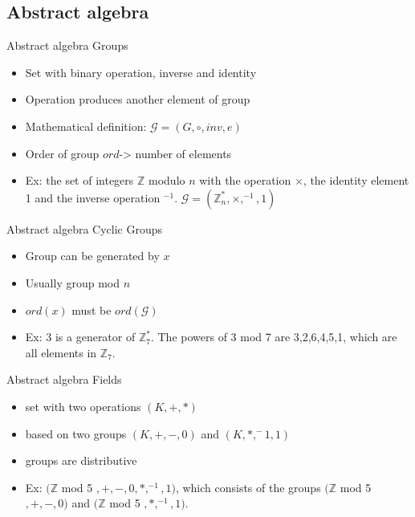 \documentclass{beamer}
\begin{document}
\subsection{Abstract algebra}
\begin{frame}{Abstract algebra}
	Groups
	\begin{itemize}
		\item Set with binary operation, inverse and identity
		\item Operation produces another element of group
		\item Mathematical definition: $\mathcal{G} = (G, \circ, inv, e)$
		\item Order of group $ord$-> number of elements
		\item Ex: the set of integers $\mathbb{Z}$ modulo $n$ with the operation $\times$, the identity element 1 and the inverse operation $^{-1}$. $\mathcal{G} = (\mathbb{Z}_{n}^*, \times, ^{-1}, 1)$
	\end{itemize}
\end{frame}
\begin{frame}{Abstract algebra}
	Cyclic Groups
	\begin{itemize}
		\item Group can be generated by $x$
		\item Usually group mod $n$
		\item $ord(x)$ must be $ord(\mathcal{G})$
		\item Ex: 3 is a generator of $\mathbb{Z}_7^*$. The powers of 3 mod 7 are 3,2,6,4,5,1, which are all elements in $\mathbb{Z}_7$.
	\end{itemize}
\end{frame}
\begin{frame}{Abstract algebra}
	Fields
	\begin{itemize}
		\item set with two operations $(K, +, *)$
		\item based on two groups $(K, +, -, 0)$ and $(K, *, ^-1, 1)$
		\item groups are distributive
		\item Ex: $(\mathbb{Z}$ mod 5 $, +, -, 0, *, ^{-1}, 1)$, which consists of the groups $(\mathbb{Z}$ mod 5 $, +, -, 0)$ and $(\mathbb{Z}$ mod 5 $, *, ^{-1}, 1)$.
	\end{itemize}
\end{frame}
\end{document}
